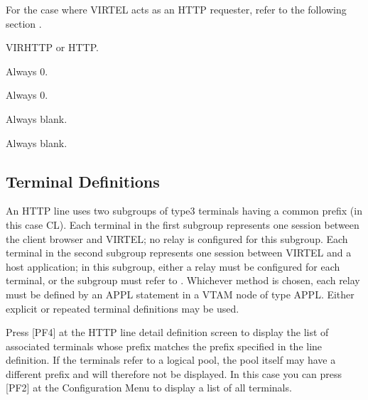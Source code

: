\documentclass[letterpaper,10pt,english]{sphinxmanual}
\begin{document}
\begin{description}
\sphinxAtStartPar
For the case where VIRTEL acts as an HTTP requester, refer to the following section {\hyperref[\detokenize{connectivity_guide:v461cn-httpoutbound}]{}}.

\sphinxAtStartPar
VIRHTTP or HTTP.

\sphinxAtStartPar
Always 0.

\sphinxAtStartPar
Always 0.

\sphinxAtStartPar
Always blank.

\sphinxAtStartPar
Always blank.

\end{description}

\ignorespaces 

\subsection{Terminal Definitions}
\label{\detokenize{connectivity_guide:terminal-definitions}}\label{\detokenize{connectivity_guide:index-12}}
\sphinxAtStartPar
An HTTP line uses two sub\sphinxhyphen{}groups of type\sphinxhyphen{}3 terminals having a common prefix (in this case CL). Each terminal in the first sub\sphinxhyphen{}group represents one session between the client browser and VIRTEL; no relay is configured for this sub\sphinxhyphen{}group. Each terminal in the second sub\sphinxhyphen{}group represents one session between VIRTEL and a host application; in this sub\sphinxhyphen{}group, either a relay must be configured for each terminal, or the sub\sphinxhyphen{}group must refer to {\hyperref[\detokenize{connectivity_guide:v461cn-logicalpool}]{}}. Whichever method is chosen, each relay must be defined by an APPL statement in a VTAM node of type APPL. Either explicit or repeated terminal definitions may be used.

\sphinxAtStartPar
Press {[}PF4{]} at the HTTP line detail definition screen to display the list of associated terminals whose prefix matches the prefix specified in the line definition. If the terminals refer to a logical pool, the pool itself may have a different prefix and will therefore not be displayed. In this case you can press {[}PF2{]} at the Configuration Menu to display a list of all terminals.
\end{document}
